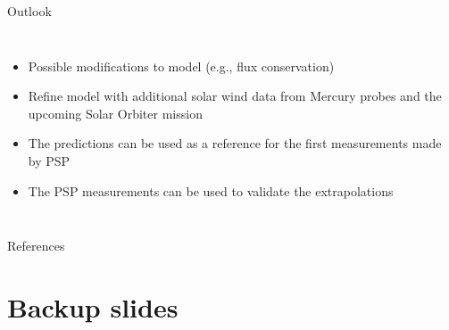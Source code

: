 {
\begin{frame}[plain,t]{Outlook}{}
	\begin{columns}[c]
		
		\begin{itemize}
			\item Possible modifications to model (e.g., flux conservation)
			\item Refine model with additional solar wind data from Mercury probes and the upcoming Solar Orbiter mission
			\item The predictions can be used as a reference for the first measurements made by PSP
			\item The PSP measurements can be used to validate the extrapolations
		\end{itemize}
		
		\vspace{15mm}
		
		
		
		
	\end{columns}
\end{frame}
}

\begin{frame}[t,allowframebreaks]{References}
	\tiny
	\begin{thebibliography}{10}
	
		\beamertemplatebookbibitems
		
		\beamertemplatearticlebibitems
		
		

	\end{thebibliography}
\end{frame}


\appendix


\section{Backup slides}

